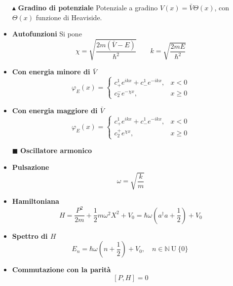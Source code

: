 \documentclass{book}
\newcommand{\g}{\textbf}
\newcommand{\e}{\begin{equation}}
\newcommand{\ex}{\end{equation} }
\renewcommand{\it}{\item[$\cdot$]}
\begin{document}
\begin{multicols}{4}
\begin{itemize}
    
\item [$\blacktriangle$] \g{Gradino di potenziale}
    Potenziale a gradino $V(x) = \bar{V} \Theta(x)$, con $\Theta(x)$ funzione di Heaviside.

    \it \g{Autofunzioni}
    Si pone
    \e{\chi = \sqrt{\frac{2m(\bar{V} - E)}{\hbar^2}} \qquad k = \sqrt{\frac{2mE}{\hbar^2}}} \ex

    \it \g{Con energia minore di $\bar{V}$}
    \e{\varphi_E(x) = 
    \begin{cases}
        c_+^1 e^{ikx} + c_-^1 e^{-ikx}, & x < 0 \\
        c_2^- e^{-\chi x}, & x \geq 0
    \end{cases}} \ex

    \it \g{Con energia maggiore di $\bar{V}$}
    \e{\varphi_E(x) = 
    \begin{cases}
        c_+^1 e^{ikx} + c_-^1 e^{-ikx}, & x < 0 \\
        c_2^+ e^{\chi x}, & x \geq 0
    \end{cases}} \ex

   \item [$\blacksquare$] \g{Oscillatore armonico}
    \it \g{Pulsazione}
        \e{\omega = \sqrt{\frac{k}{m}}} \ex

    \it \g{Hamiltoniana}
        \e{H = \frac{P^2}{2m} + \frac{1}{2}m\omega^2 X^2 + V_0 = \hbar\omega\left(a^\dagger a + \frac{1}{2}\right) + V_0} \label{oscillatore armonico}\ex

    \it \g{Spettro di $H$}
        \e{ E_{n} = \hbar\omega\left(n + \frac{1}{2}\right) + V_0, \quad n \in \mathbb{N}\ \text{U} \ \{0\}\ } \ex
    \it \g{Commutazione con la parità}
        \e{[P, H] = 0} \ex


\end{itemize}
\end{multicols}
\end{document}
